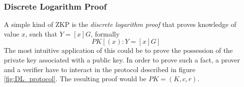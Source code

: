 \subsubsection{Discrete Logarithm Proof}
A simple kind of ZKP is the \textit{discrete logarithm proof} that proves knowledge of value $x$, such that \( Y = [x]G \), formally
\[
PK[(x) : Y = [x]G]
\]
The most intuitive application of this could be to prove the possession of the private key associated with a public key. In order to prove such a fact, a prover and a verifier have to interact in the protocol described in figure \ref{fig:DL_protocol}. The resulting proof would be \( PK = (K, c, r) \).


